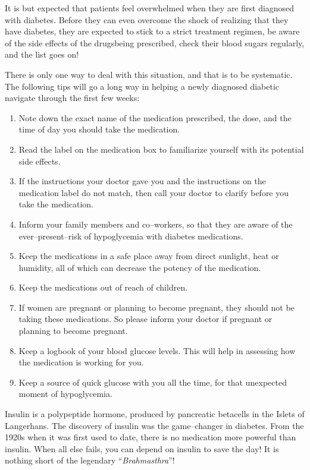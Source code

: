 
It is but expected that patients feel overwhelmed when they are first diagnosed with diabetes. Before they can even overcome the shock of realizing that they have diabetes, they are expected to stick to a strict treatment regimen, be aware of the side effects of the drugs\break being prescribed, check their blood sugars regularly, and the list goes on!

There is only one way to deal with this situation, and that is to be systematic. The following tips will go a long way in helping a newly diagnosed diabetic navigate through the first few weeks:

\begin{enumerate}[•]
\itemsep=0pt
\item Note down the exact name of the medication prescribed, the dose, and the time of day you should take the medication.
\item Read the label on the medication box to familiarize yourself with its potential side effects.
\item If the instructions your doctor gave you and the instructions on the medication label do not match, then call your doctor to clarify before you take the medication.
\item Inform your family members and co–workers, so that they are aware of the ever–present–risk of hypoglycemia with diabetes medications.
\item Keep the medications in a safe place away from direct sunlight, heat or humidity, all of which can decrease the potency of the medication.
\item Keep the medications out of reach of children.
\item If women are pregnant or planning to become pregnant, they should not be taking these medications. So please inform your doctor if pregnant or planning to become pregnant.
\item Keep a logbook of your blood glucose levels. This will help in asse\-ssing how the medication is working for you.
\item Keep a source of quick glucose with you all the time, for that un\-expected moment of hypoglycemia.
\end{enumerate}


Insulin is a polypeptide hormone, produced by pancreatic beta\break cells in the Islets of Langerhans. The discovery of insulin was the game–changer in diabetes. From the 1920s when it was first used to date, there is no medication more powerful than insulin. When all else fails, you can depend on insulin to save the day! It is nothing short of the legendary “\textit{Brahmasthra}”!

